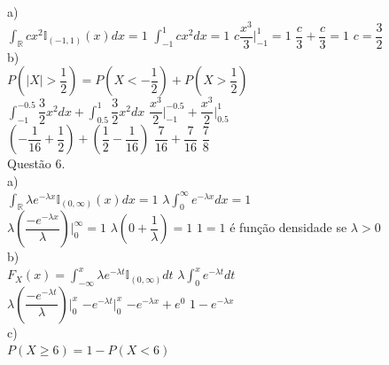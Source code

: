 \documentclass[12pt]{article}
\begin{document}
\noindent a)\\

$\displaystyle\int_{\mathds{R}}cx^{2}\mathds{I}_{(-1,1)}(x)dx=1$\qquad\qquad
$\displaystyle\int_{-1}^{1}cx^{2}dx=1$\qquad\qquad
$c\dfrac{x^{3}}{3}\biggr|_{-1}^{1}=1$\quad\quad
$\dfrac{c}{3}+\dfrac{c}{3}=1$\quad\quad
$c=\dfrac{3}{2}$\\

\noindent b)\\

$P\left(|X|>\dfrac{1}{2}\right)=P\left(X<-\dfrac{1}{2}\right)+P\left(X>\dfrac{1}{2}\right)$\\

$\displaystyle\int_{-1}^{-0.5}\dfrac{3}{2}x^{2}dx+\int_{0.5}^{1}\dfrac{3}{2}x^{2}dx$\qquad\qquad
$\dfrac{x^3}{2}\biggr|_{-1}^{-0.5}+\dfrac{x^3}{2}\biggr|_{0.5}^{1}$\\

$\left(-\dfrac{1}{16}+\dfrac{1}{2}\right)+\left(\dfrac{1}{2}-\dfrac{1}{16}\right)$\qquad\qquad
$\dfrac{7}{16}+\dfrac{7}{16}$\qquad\qquad
$\dfrac{7}{8}$\\

\noindent Questão 6.\\

\noindent a)\\

$\displaystyle\int_{\mathds{R}}\lambda e^{-\lambda x}\mathds{I}_{(0,\infty)}(x)dx=1$\qquad\qquad
$\lambda\displaystyle\int_{0}^{\infty}e^{-\lambda x}dx=1$\\

$\lambda\left(\dfrac{-e^{-\lambda x}}{\lambda}\right)\biggr|_{0}^{\infty}=1$\qquad\qquad 
$\lambda\left(0+\dfrac{1}{\lambda}\right)=1$\qquad\quad
$1=1$\qquad\qquad
é função densidade se $\lambda>0$\\

\noindent b)\\

$F_{X}(x)=\displaystyle\int_{-\infty}^{x}\lambda e^{-\lambda t}\mathds{I}_{(0,\infty)}dt$\qquad\qquad
$\lambda\displaystyle\int_{0}^{x}e^{-\lambda t}dt$\\

$\lambda\left(\dfrac{-e^{-\lambda t}}{\lambda}\right)\biggr|_{0}^{x}$\qquad\qquad
$-e^{-\lambda t}\biggr|_{0}^{x}$\qquad\qquad
$-e^{-\lambda x}+e^{0}$\qquad\qquad
$1-e^{-\lambda x}$\\

\noindent c)\\

$P(X\geq6)=1-P(X<6)$\\
\end{document}
